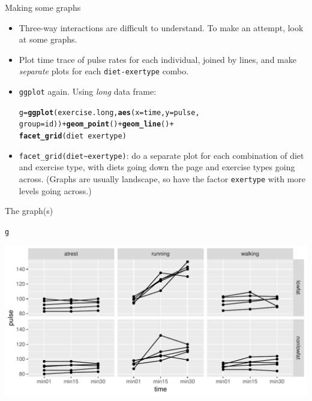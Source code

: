 \documentclass[unknownkeysallowed]{beamer}\usepackage[]{graphicx}\usepackage[]{color}
\makeatletter
\def\maxwidth{ %
  \ifdim\Gin@nat@width>\linewidth
    \linewidth
  \else
    \Gin@nat@width
  \fi
}
\newcommand{\hlopt}[1]{\textcolor[rgb]{0,0,0}{#1}}%
\newcommand{\hlstd}[1]{\textcolor[rgb]{0.345,0.345,0.345}{#1}}%
\newcommand{\hlkwb}[1]{\textcolor[rgb]{0.69,0.353,0.396}{#1}}%
\newcommand{\hlkwc}[1]{\textcolor[rgb]{0.333,0.667,0.333}{#1}}%
\newcommand{\hlkwd}[1]{\textcolor[rgb]{0.737,0.353,0.396}{\textbf{#1}}}%
\newenvironment{kframe}{%
 \def\at@end@of@kframe{}%
 \ifinner\ifhmode%
  \def\at@end@of@kframe{\end{minipage}}%
  \begin{minipage}{\columnwidth}%
 \fi\fi%
 \def\FrameCommand##1{\hskip\@totalleftmargin \hskip-\fboxsep
 \colorbox{shadecolor}{##1}\hskip-\fboxsep
     \hskip-\linewidth \hskip-\@totalleftmargin \hskip\columnwidth}%
 \MakeFramed {\advance\hsize-\width
   \@totalleftmargin\z@ \linewidth\hsize
   \@setminipage}}%
 {\par\unskip\endMakeFramed%
 \at@end@of@kframe}
\newenvironment{knitrout}{}{} %
\makeatother
\begin{document}
\begin{frame}[fragile]{Making some graphs}
  
  \begin{itemize}
  \item Three-way  interactions are difficult to understand. To make
    an attempt, look at some graphs.
  \item Plot time trace of pulse rates for each individual, joined by
    lines, and make \emph{separate} plots for each
    \texttt{diet-exertype} combo.
  \item \texttt{ggplot} again. Using \emph{long} data frame:

\begin{knitrout}
\color{fgcolor}\begin{kframe}
\begin{alltt}
\hlstd{g}\hlkwb{=}\hlkwd{ggplot}\hlstd{(exercise.long,}\hlkwd{aes}\hlstd{(}\hlkwc{x}\hlstd{=time,}\hlkwc{y}\hlstd{=pulse,}
  \hlkwc{group}\hlstd{=id))}\hlopt{+}\hlkwd{geom_point}\hlstd{()}\hlopt{+}\hlkwd{geom_line}\hlstd{()}\hlopt{+}
  \hlkwd{facet_grid}\hlstd{(diet}\hlopt{~}\hlstd{exertype)}
\end{alltt}
\end{kframe}
\end{knitrout}

\item \verb=facet_grid(diet~exertype)=: do a separate plot for each
  combination of diet and exercise type, with diets going down the
  page and exercise types going across. (Graphs are usually landscape,
  so have the factor \texttt{exertype} with more levels going across.)

\end{itemize}
  
\end{frame}

 
\begin{frame}[fragile]{The graph(s)}
  
\begin{knitrout}
\color{fgcolor}\begin{kframe}
\begin{alltt}
\hlstd{g}
\end{alltt}
\end{kframe}
\includegraphics[width=\maxwidth]{figure/unnamed-chunk-256-1} 

\end{knitrout}
  
  
\end{frame}
\end{document}
